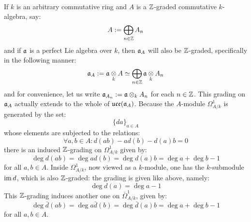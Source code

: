         \begin{remark} \label{remark: Z_gradings_on_toroidal_lie_algebras}
            If $k$ is an arbitrary commutative ring and $A$ is a $\mathbb{Z}$-graded commutative $k$-algebra, say:
                $$A := \bigoplus_{n \in \mathbb{Z}} A_n$$
            and if $\mathfrak{a}$ is a perfect Lie algebra over $k$, then $\mathfrak{a}_A$ will also be $\mathbb{Z}$-graded, specifically in the following manner:
                $$\a_A := \a \tensor_k A \cong \bigoplus_{n \in \Z} \a \tensor_k A_n$$
            and for convenience, let us write $\a_{A_n} := \a \tensor_k A_n$ for each $n \in \mathbb{Z}$. This grading on $\mathfrak{a}_A$ actually extends to the whole of $\mathfrak{uce}(\mathfrak{a}_A)$. Because the $A$-module $\Omega^1_{A/k}$ is generated by the set:
                $$\{da\}_{a \in A}$$
            whose elements are subjected to the relations:
                $$\forall a, b \in A: d(ab) - a d(b) - d(a) b = 0$$
           there is an induced $\mathbb{Z}$-grading on $\Omega^1_{A/k}$ given by:
                $$\deg d(ab) = \deg a d(b) = \deg d(a) b = \deg a + \deg b - 1$$
            for all $a, b \in A$. Inside $\Omega^1_{A/k}$, now viewed as a $k$-module, one has the $k$-submodule $\operatorname{im} d$, which is also $\mathbb{Z}$-graded: the grading is given like above, namely:
                $$\deg d(a) = \deg a - 1$$
            This $\mathbb{Z}$-grading induces another one on $\bar{\Omega}^1_{A/k}$, given by:
                $$\deg \bar{d}(ab) = \deg a \bar{d}(b) = \deg \bar{d}(a) b = \deg a + \deg b - 1$$
            for all $a, b \in A$.


\end{remark}
